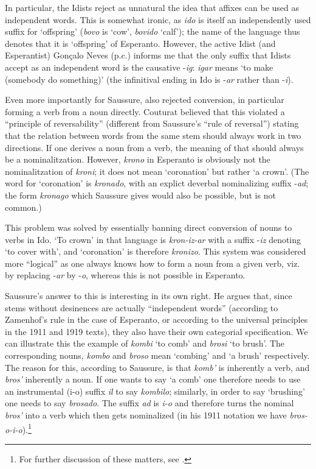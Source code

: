 \documentclass[output=paper]{langsci/langscibook}
\begin{document}
In particular, the Idists reject as unnatural the idea that affixes
can be used as independent words. This is somewhat ironic, as
\emph{ido} is itself an independently used suffix for `offspring'
(\emph{bovo} is `cow', \emph{bovido} `calf'); the name of the language
thus denotes that it is `offspring' of Esperanto. However, the active
Idist (and Esperantist) Gon\c{c}alo Neves (p.c.) informs me that the
only suffix that Idists accept as an independent word is the causative
-\emph{ig}: \emph{igar} means `to make (somebody do something)' (the
infinitival ending in Ido is -\emph{ar} rather than -\emph{i}).

Even more importantly for Saussure, \citet{couturat1907} also rejected
conversion, in particular forming a verb from a noun
directly. Couturat believed that this violated a ``principle of
reversability'' (different from Saussure's ``rule of reversal'') stating
that the relation between words from the same stem should always work
in two directions. If one derives a noun from a verb, the meaning of
that should always be a nominalitzation. However, \emph{krono} in
Esperanto is obviously not the nominalitzation of \emph{kroni}; it does
not mean `coronation' but rather `a crown'. (The word for
`coronation' is \emph{kronado}, with an explict deverbal
nominalizing suffix \mbox{-\emph{ad}}; the form \emph{kronago} which Saussure
gives would also be possible, but is not common.)

This problem was solved by essentially banning direct conversion of
nouns to verbs in Ido. `To crown' in that language is
\emph{kron-iz-ar} with a suffix -\emph{iz} denoting `to cover with',
and `coronation' is therefore \emph{kronizo}. This system was
considered more ``logical'' as one always knows how to form a noun from
a given verb, viz. by replacing -\emph{ar} by -\emph{o}, whereas this
is not possible in Esperanto.

Saussure's answer to this is interesting in its own right. He argues
that, since stems without desinences are actually ``independent words''
(according to Zamenhof's rule in the case of Esperanto, or according
to the universal principles in the 1911 and 1919 texts), they also
have their own categorial specification. We can illustrate this the
example of \emph{kombi} `to comb' and \emph{brosi} `to brush'. The
corresponding nouns, \emph{kombo} and \emph{broso} mean `combing' and
`a brush' respectively. The reason for this, according to Saussure, is
that \emph{komb'} is inherently a verb, and \emph{bros'} inherently a
noun. If one wants to say `a comb' one therefore needs to use an
instrumental (i-o) suffix \emph{il} to say \emph{kombilo}; similarly,
in order to say `brushing' one needs to say \emph{brosado}. The suffix
\emph{ad} is \emph{i-o} and therefore turns the nominal \emph{bros'}
into a verb which then gets nominalized (in his 1911 notation we have
\emph{bros-o-i-o}).\footnote{For further discussion of these matters,
  see \citet{vanOostendorp98:economy-in-esperanto}.}
\end{document}
